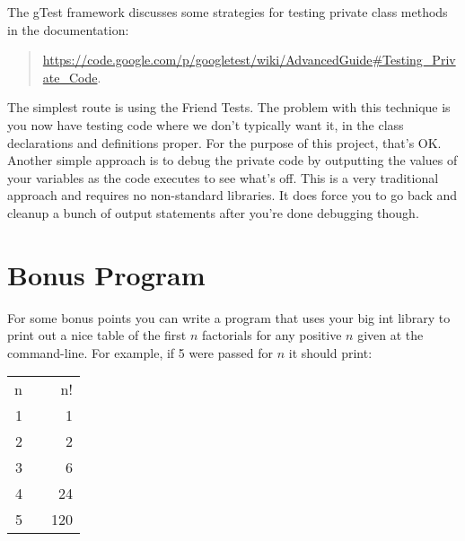 \documentclass[10pt]{article}
\begin{document}
The gTest framework discusses some strategies for testing private class methods in the documentation:
\begin{quote}
\url{https://code.google.com/p/googletest/wiki/AdvancedGuide#Testing_Private_Code}.
\end{quote}
The simplest route is using the Friend Tests.  The problem with this technique is you now have testing code where we don't typically want it, in the class declarations and definitions proper. For the purpose of this project, that's OK\@. Another simple approach is to debug the private code by outputting the values of your variables as the code executes to see what's off. This is a very traditional approach and requires no non-standard libraries.  It does force you to go back and cleanup a bunch of output statements after you're done debugging though.

\section{Bonus Program}

For some bonus points you can write a program that uses your big int library to print out a nice table of the first $n$ factorials for any positive $n$ given at the command-line. For example, if 5 were passed for $n$ it should print:

\begin{tabular}{rcr}
  n & & n! \\
  1 & & 1 \\
  2 & & 2 \\
  3 & & 6 \\
  4 & & 24 \\
  5 & & 120
\end{tabular}
\end{document}
